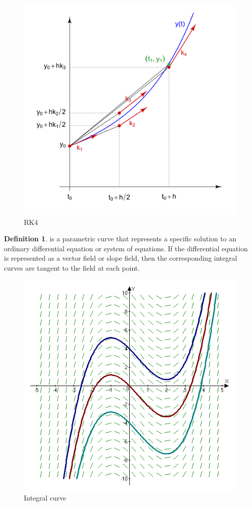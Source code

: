 \documentclass[a4paper]{article}
\theoremstyle{definition}
\newtheorem{definition}{Definition}
\theoremstyle{plain}
\begin{document}
\begin{figure}[H]
    \centering
    \includegraphics[scale=0.15]{figure/rk4.png}
    \caption{RK4}
\end{figure}

\begin{definition}
 is a parametric curve that represents a specific solution to an ordinary differential equation or system of equations. If the differential equation is represented as a vector field or slope field, then the corresponding integral curves are tangent to the field at each point.
\end{definition}

\begin{figure}[H]
  \centering
  \includegraphics[scale=0.4]{figure/Slope_Field.png}
  \caption{Integral curve}
\end{figure}
\end{document}
